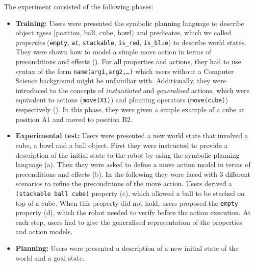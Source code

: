The experiment consisted of the following phases:
\begin{itemize}
  \item{\begin{sloppypar} \textbf{Training:} Users were presented the symbolic planning language to describe object \textit{types} (\ie position, ball, cube, bowl) and predicates, which we called \textit{properties} (\ie \texttt{empty}, \texttt{at}, \texttt{stackable}, \texttt{is\_red}, \texttt{is\_blue}) to describe world states.
They were shown how to model a simple move action in terms of preconditions and effects ().
For all properties and actions, they had to use syntax of the form \texttt{name(arg1,arg2,\dots)} which users without a  Computer Science background might be unfamiliar with.
Additionally, they were introduced to the concepts of \textit{instantiated} and \textit{generalised} actions, which were equivalent to actions (\eg \texttt{move(X1)}) and planning operators (\eg \texttt{move(cube)}) respectively ().
In this phase, they were given a simple example of a cube at position A1 and moved to position B2.\end{sloppypar}
}
  \item{\textbf{Experimental test:} Users were presented a new world state that involved a cube, a bowl and a ball object. 
  	First they were instructed to provide a description of the initial state to the robot by using the symbolic planning language (a).
Then they were asked to define a move action model in terms of preconditions and effects (b).
In the following they were faced with 3 different scenarios to refine the preconditions of the move action.
Users derived a \texttt{(stackable ball cube)} property (c), which allowed a ball to be stacked on top of a cube.
When this property did not hold, users proposed the \texttt{empty} property (d), which the robot needed to verify before the action execution.
At each step, users had to give the generalised representation of the properties and action models.}
  \item{\textbf{Planning:} Users were presented a description of a new initial state of the world and a goal state.
}
\end{itemize}
